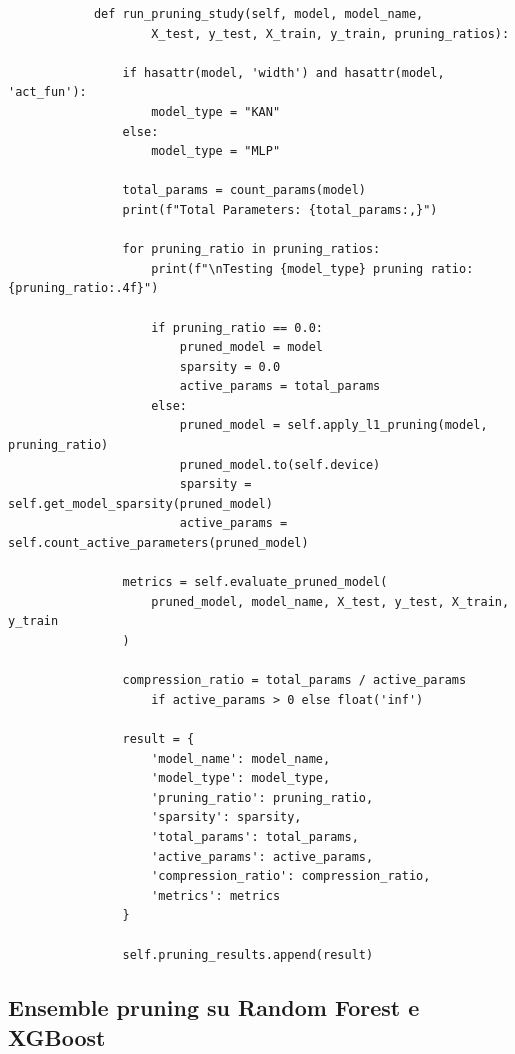 \documentclass[a4paper,12pt]{report}
\begin{document}
\begin{verbatim}
			def run_pruning_study(self, model, model_name, 
					X_test, y_test, X_train, y_train, pruning_ratios):
				
				if hasattr(model, 'width') and hasattr(model, 'act_fun'):
					model_type = "KAN"
				else:
					model_type = "MLP"
				
				total_params = count_params(model)
				print(f"Total Parameters: {total_params:,}")
				
				for pruning_ratio in pruning_ratios:
					print(f"\nTesting {model_type} pruning ratio: {pruning_ratio:.4f}")
				
					if pruning_ratio == 0.0:
						pruned_model = model
						sparsity = 0.0
						active_params = total_params
					else:
						pruned_model = self.apply_l1_pruning(model, pruning_ratio)
						pruned_model.to(self.device)
						sparsity = self.get_model_sparsity(pruned_model)
						active_params = self.count_active_parameters(pruned_model)
				
				metrics = self.evaluate_pruned_model(
					pruned_model, model_name, X_test, y_test, X_train, y_train
				)
				
				compression_ratio = total_params / active_params 
					if active_params > 0 else float('inf')
				
				result = {
					'model_name': model_name,
					'model_type': model_type,
					'pruning_ratio': pruning_ratio,
					'sparsity': sparsity,
					'total_params': total_params,
					'active_params': active_params,
					'compression_ratio': compression_ratio,
					'metrics': metrics
				}
				
				self.pruning_results.append(result)
	\end{verbatim}
	
	\subsection{Ensemble pruning su Random Forest e XGBoost}
	
\end{document}
